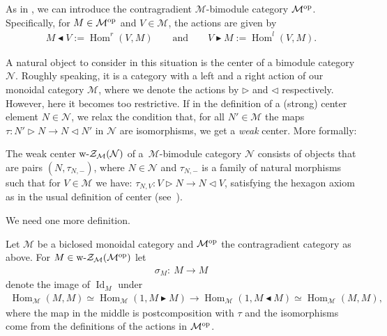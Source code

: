 \documentclass[pdftex]{sigma}
\newcommand{\Zc}{\mathcal{Z}}
\newcommand{\Nc}{\mathcal{N}}
\newcommand{\id}{1}
\newcommand{\la}{\triangleright}
\newcommand{\ra}{\triangleleft}
\newcommand{\lab}{\blacktriangleright}
\newcommand{\rab}{\blacktriangleleft}
\numberwithin{equation}{section}
\begin{document}
As in \cite{s}, we can introduce the contragradient $\mathcal{M}$-bimodule category $\mathcal{M}^{\rm op}$. Specifically, for $M\in \mathcal{M}^{\rm op}$ and $V\in \mathcal{M}$, the actions are given by
 \begin{gather*}
 M\rab V := \operatorname{Hom}^r(V, M) \qquad \text{and} \qquad V\lab M :=\operatorname{Hom}^l(V, M) .
 \end{gather*}

A natural object to consider in this situation is the center of a bimodule category $\Nc$. Roughly speaking, it is a category with a left and a right action of our monoidal category $\mathcal{M}$, where we denote the actions by $\la$ and $\ra$ respectively. However, here it becomes too restrictive. If in the definition of a (strong) center element $N\in\Nc$, we relax the condition that, for all $N'\in\mathcal{M}$ the maps $\tau\colon N'\la N\to N\ra N'$ in $\Nc$ are isomorphisms, we get a \emph{weak} center. More formally:

 \begin{Definition} The weak center $ \text{\rm w-}\Zc_{\mathcal{M}}(\mathcal{N})$ of a~$\mathcal{M}$-bimodule category $\mathcal{N}$ consists of objects that are pairs $(N, \tau_{N,-})$, where $N \in \mathcal{N}$ and $\tau_{N,-}$ is a family of natural morphisms such that for $V \in \mathcal{M}$ we have: $\tau_{N,V}\colon V \la N \to N \ra V $, satisfying the hexagon axiom as in the usual definition of center (see~\cite{ENO}).
 \end{Definition}

 We need one more definition.

\begin{Definition}Let $\mathcal{M} $ be a biclosed monoidal category and $\mathcal{M}^{\rm op}$ the contragradient category as above. For $M\in \text{\rm w-}\Zc_{\mathcal{M}}(\mathcal{M}^{\rm op})$ let
\begin{gather*}
\sigma_M\colon \ M\to M
\end{gather*} denote the image of $\operatorname{Id}_M$ under \begin{gather*}\operatorname{Hom}_\mathcal{M}(M,M)\simeq\operatorname{Hom}_\mathcal{M}(\id,M\lab M)\to\operatorname{Hom}_\mathcal{M}(\id,M\rab M)\simeq \operatorname{Hom}_\mathcal{M}(M,M),\end{gather*}
where the map in the middle is postcomposition with $\tau$ and the isomorphisms come from the definitions of the actions in $\mathcal{M}^{\rm op}$.
\end{Definition}
\end{document}
